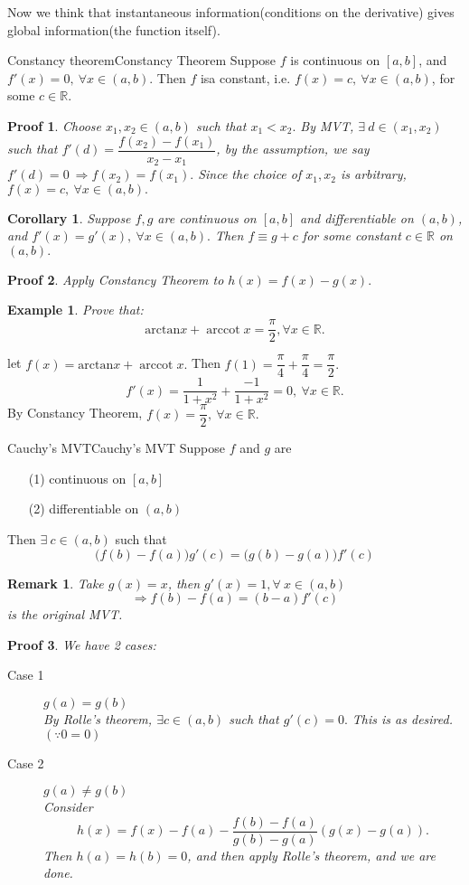 \documentclass[12pt,a4paper]{article}
\DeclareMathOperator{\arccot}{arccot}
\newcommand{\R}{\mathbb{R}}
\theoremstyle{mystyle}
\numberwithin{figure}{subsection}
\newtheorem{cor}{Corollary}[subsection] %
\newtheorem{exm}{Example}[subsection] %
\newtheorem{rem}{Remark}[subsection] %
\newtheorem{pf}{Proof}[subsection]
\newenvironment{ex}{\begin{exBox}\begin{exm}}{\end{exm}\end{exBox}}
\newenvironment{cl}{\begin{corBox}\begin{cor}}{\end{cor}\end{corBox}}
\begin{document}
Now we think that instantaneous information(conditions on the derivative) gives global information(the function itself).
\begin{thm}{Constancy theorem}{Constancy Theorem}
Suppose $f$ is continuous on $[a,b]$, and $f'(x)=0, \ \forall x \in (a,b)$. Then $f$ isa constant, i.e. $f(x)=c, \ \forall x \in (a,b)$, for some $c \in \R.$
\end{thm}
\begin{pf}
Choose $x_1,x_2 \in (a,b)$ such that $x_1 < x_2.$ By MVT, $\exists \ d \in (x_1,x_2)$ such that $f'(d) = \dfrac{f(x_2)-f(x_1)}{x_2-x_1}$, by the assumption, we say $f'(d)=0 \ \Rightarrow f(x_2)=f(x_1).$ Since the choice of $x_1, x_2$ is arbitrary, $f(x)=c, \ \forall x \in (a,b).$
\end{pf}
\begin{cl}
Suppose $f,g$ are continuous on $[a,b]$ and differentiable on $(a,b)$, and $f'(x)=g'(x), \ \forall x \in (a,b).$ Then $f \equiv g+c$ for some constant $c \in \R$ on $(a,b).$
\end{cl}
\begin{pf}
Apply Constancy Theorem to $h(x)=f(x)-g(x).$
\end{pf}
\begin{ex}
Prove that:
\[
\text{arctan} x + \arccot x = \dfrac{\pi}{2}, \forall x \in \R.
\]
\end{ex}
let $f(x)= \text{arctan}x+\arccot x.$ Then $f(1)=\dfrac{\pi}{4}+\dfrac{\pi}{4}=\dfrac{\pi}{2}.$
\[
f'(x)=\dfrac{1}{1+x^2}+\dfrac{-1}{1+x^2}=0, \ \forall x \in \R.
\]
By Constancy Theorem, $f(x)=\dfrac{\pi}{2}, \ \forall x \in \R.$
\begin{thm}{Cauchy's MVT}{Cauchy's MVT}
Suppose $f$ and $g$ are
\begin{itemize}
    \item [(1)] continuous on $[a,b]$
    \item [(2)] differentiable on $(a,b)$
\end{itemize}
Then $\exists \ c \in (a,b)$ such that
\[
\big(f(b)-f(a)\big)g'(c)=\big(g(b)-g(a)\big)f'(c)
\]
\end{thm}
\begin{rem}
Take $g(x)=x$, then $g'(x)=1, \forall \ x \in (a,b)$
\[
\Rightarrow f(b)-f(a)=(b-a)f'(c)
\]
is the original MVT.
\end{rem}
\begin{pf}
We have 2 cases:
\begin{description}
    \item[Case 1] $g(a) = g(b)$ \\ 
    By Rolle's theorem, $\exists c \in (a,b)$ such that $g'(c)=0.$ This is as desired.$(\because 0=0)$
    \item[Case 2] $g(a) \neq g(b)$ \\
    Consider $$h(x)=f(x)-f(a)-\dfrac{f(b)-f(a)}{g(b)-g(a)}(g(x)-g(a)).$$ Then $h(a)=h(b)=0$, and then apply Rolle's theorem, and we are done.
\end{description}
\end{pf}
\end{document}
